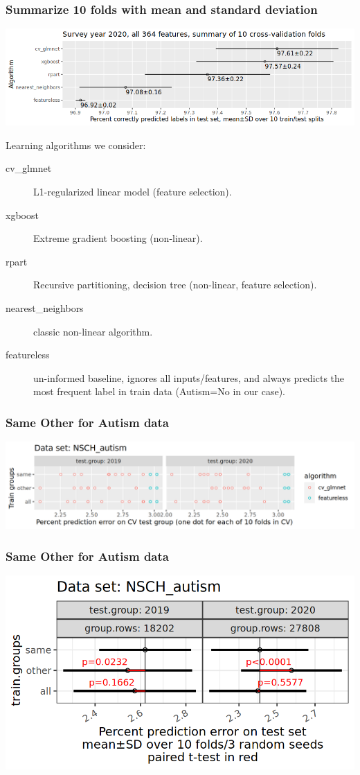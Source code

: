 \documentclass{beamer}
\begin{document}
\begin{frame}
  \frametitle{Summarize 10 folds with mean and standard deviation}
  \includegraphics[width=\textwidth]{download-nsch-mlr3batchmark-registry-one-set-all-features-stats.png}

Learning algorithms we consider:
\begin{description}
\item[cv\_glmnet] L1-regularized linear model (feature selection).
\item[xgboost] Extreme gradient boosting (non-linear).
\item[rpart] Recursive partitioning, decision tree (non-linear, feature selection).
\item[nearest\_neighbors] classic non-linear algorithm.
\item[featureless] un-informed baseline, ignores all inputs/features,
  and always predicts the most frequent label in train data (Autism=No
  in our case).
\end{description}

\end{frame}

\begin{frame}
  \frametitle{Same Other for Autism data}
  \includegraphics[width=\textwidth]{NSCH_autism_error_glmnet_featureless.png}
\end{frame}

\begin{frame}
  \frametitle{Same Other for Autism data}
  \includegraphics[width=\textwidth]{NSCH_autism_error_glmnet_sizes_mean_SD_pvalue.png}
\end{frame}
\end{document}
